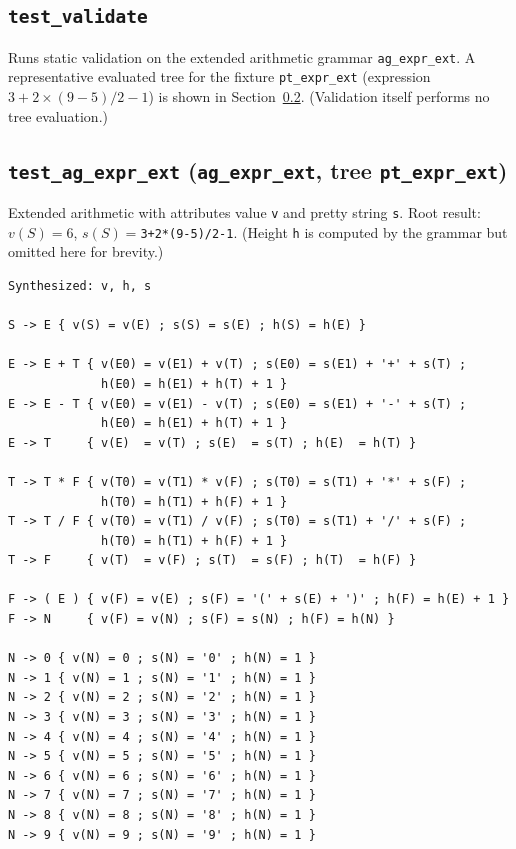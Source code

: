 \subsection{\texttt{test\_validate}}
 Runs static validation on the extended arithmetic grammar \texttt{ag\_expr\_ext}. A representative evaluated tree for the fixture \texttt{pt\_expr\_ext} (expression \(3 + 2 \times (9-5) / 2 - 1\)) is shown in Section~\ref{sec:expr-ext-tree}. (Validation itself performs no tree evaluation.) 


\subsection{\texttt{test\_ag\_expr\_ext} (\texttt{ag\_expr\_ext}, tree \texttt{pt\_expr\_ext})}
\label{sec:expr-ext-tree}
 Extended arithmetic with attributes value \texttt{v} and pretty string \texttt{s}. Root result: \(v(S)=6\), \(s(S)=\)\texttt{3+2*(9-5)/2-1}. (Height \texttt{h} is computed by the grammar but omitted here for brevity.) 

 \begin{verbatim}
Synthesized: v, h, s

S -> E { v(S) = v(E) ; s(S) = s(E) ; h(S) = h(E) }

E -> E + T { v(E0) = v(E1) + v(T) ; s(E0) = s(E1) + '+' + s(T) ;
             h(E0) = h(E1) + h(T) + 1 }
E -> E - T { v(E0) = v(E1) - v(T) ; s(E0) = s(E1) + '-' + s(T) ; 
             h(E0) = h(E1) + h(T) + 1 }
E -> T     { v(E)  = v(T) ; s(E)  = s(T) ; h(E)  = h(T) }

T -> T * F { v(T0) = v(T1) * v(F) ; s(T0) = s(T1) + '*' + s(F) ;
             h(T0) = h(T1) + h(F) + 1 }
T -> T / F { v(T0) = v(T1) / v(F) ; s(T0) = s(T1) + '/' + s(F) ;
             h(T0) = h(T1) + h(F) + 1 }
T -> F     { v(T)  = v(F) ; s(T)  = s(F) ; h(T)  = h(F) }

F -> ( E ) { v(F) = v(E) ; s(F) = '(' + s(E) + ')' ; h(F) = h(E) + 1 }
F -> N     { v(F) = v(N) ; s(F) = s(N) ; h(F) = h(N) }

N -> 0 { v(N) = 0 ; s(N) = '0' ; h(N) = 1 }
N -> 1 { v(N) = 1 ; s(N) = '1' ; h(N) = 1 }
N -> 2 { v(N) = 2 ; s(N) = '2' ; h(N) = 1 }
N -> 3 { v(N) = 3 ; s(N) = '3' ; h(N) = 1 }
N -> 4 { v(N) = 4 ; s(N) = '4' ; h(N) = 1 }
N -> 5 { v(N) = 5 ; s(N) = '5' ; h(N) = 1 }
N -> 6 { v(N) = 6 ; s(N) = '6' ; h(N) = 1 }
N -> 7 { v(N) = 7 ; s(N) = '7' ; h(N) = 1 }
N -> 8 { v(N) = 8 ; s(N) = '8' ; h(N) = 1 }
N -> 9 { v(N) = 9 ; s(N) = '9' ; h(N) = 1 }
\end{verbatim}

